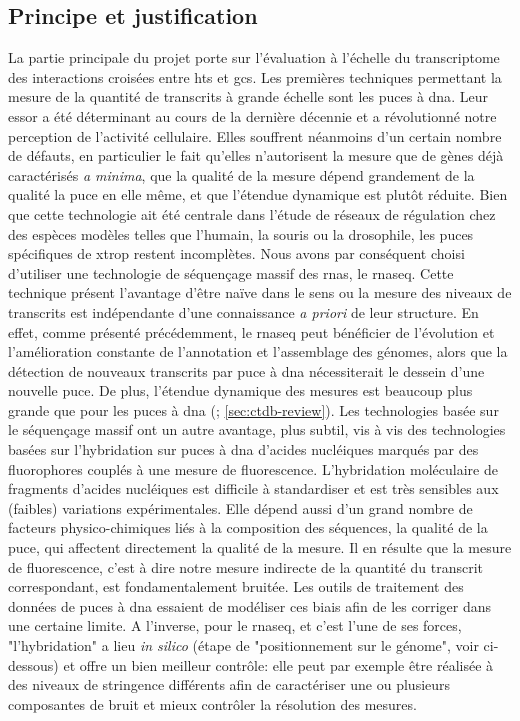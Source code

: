 \documentclass[../main.tex]{subfiles}
\begin{document}
\subsection{Principe et justification}
La partie principale du projet porte sur l'évaluation à l'échelle du transcriptome des interactions croisées entre \glspl{ht} et \glspl{gc}.
Les premières techniques permettant la mesure de la quantité de transcrits à grande échelle sont les puces à \gls{dna}.
Leur essor a été déterminant au cours de la dernière décennie et a révolutionné notre perception de l'activité cellulaire.
Elles souffrent néanmoins d'un certain nombre de défauts, en particulier le fait qu'elles n'autorisent la mesure que de gènes déjà caractérisés \textit{a minima}, que la qualité de la mesure dépend grandement de la qualité la puce en elle même, et que l'étendue dynamique est plutôt réduite.
Bien que cette technologie ait été centrale dans l'étude de réseaux de régulation chez des espèces modèles telles que l'humain, la souris ou la drosophile, les puces spécifiques de \gls{xtrop} restent incomplètes.
Nous avons par conséquent choisi d'utiliser une technologie de séquençage massif des \glspl{rna}, le \gls{rnaseq}.
Cette technique présent l'avantage d'être naïve dans le sens ou la mesure des niveaux de transcrits est indépendante d'une connaissance \textit{a priori} de leur structure.
En effet, comme présenté précédemment, le \gls{rnaseq} peut bénéficier de l'évolution et l'amélioration constante de l'annotation et l'assemblage des génomes, alors que la détection de nouveaux transcrits par puce à \gls{dna} nécessiterait le dessein d'une nouvelle puce.
De plus, l'étendue dynamique des mesures est beaucoup plus grande que pour les puces à \gls{dna} (\citealp{Grimaldi2013}; \autoref{sec:ctdb-review}).
Les technologies basée sur le séquençage massif ont un autre avantage, plus subtil, vis à vis des technologies basées sur l'hybridation sur puces à \gls{dna} d'acides nucléiques marqués par des fluorophores couplés à une mesure de fluorescence.
L'hybridation moléculaire de fragments d'acides nucléiques est difficile à standardiser et est très sensibles aux (faibles) variations expérimentales.
Elle dépend aussi d'un grand nombre de facteurs physico-chimiques liés à la composition des séquences, la qualité de la puce, qui affectent directement la qualité de la mesure.
Il en résulte que la mesure de fluorescence, c'est à dire notre mesure indirecte de la quantité du transcrit correspondant, est fondamentalement bruitée.
Les outils de traitement des données de puces à \gls{dna} essaient de modéliser ces biais afin de les corriger dans une certaine limite.
A l'inverse, pour le \gls{rnaseq}, et c'est l'une de ses forces, "l'hybridation" a lieu \textit{in silico} (étape de "positionnement sur le génome", voir ci-dessous) et offre un bien meilleur contrôle: elle peut par exemple être réalisée à des niveaux de stringence différents afin de caractériser une ou plusieurs composantes de bruit et mieux contrôler la résolution des mesures.
\end{document}
